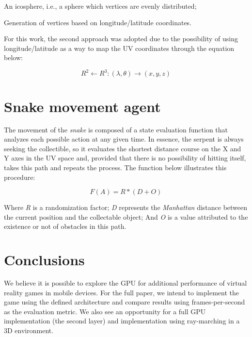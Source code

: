 \documentclass[12pt]{article}
\begin{document}
\begin{enumerate}
  \begin{item} An icosphere, i.e., a sphere which vertices are evenly distributed;
 \end{item}
  \begin{item} Generation of vertices based on longitude/latitude coordinates. \end{item}
\end{enumerate}

For this work, the second approach was adopted due to the possibility of using longitude/latitude as a way to map the UV coordinates through the equation below:

\begin{equation}
R^2 \leftarrow R^3 : (\lambda, \theta) \rightarrow (x, y, z)
\label{equation1}
\end{equation}

\section{Snake movement agent} \label{sec:agent}

The movement of the \textit{snake} is composed of a state evaluation function that analyzes each possible action at any given time. In essence, the serpent is always seeking  the collectible, so it evaluates the shortest distance course on the X and Y axes in the UV space and, provided that there is no possibility of hitting itself, takes this path and repeats the process. The function below illustrates this procedure:

\begin{equation}
F(A) = R * (D + O)
\label{equation11}
\end{equation}

Where \textit{R} is a randomization factor; \textit{D} represents the \textit{Manhattan} distance between the current position and the collectable object; And \textit{O} is a value attributed to the existence or not of obstacles in this path.

\section{Conclusions}
We believe it is possible to explore the GPU for additional performance of virtual reality games in mobile devices. For the full paper, we intend to implement the game using the defined architecture and compare results using frames-per-second as the evaluation metric. We also see an opportunity for a full GPU implementation (the second layer) and implementation using ray-marching in a 3D environment.



\end{document}
